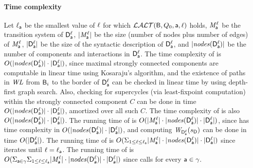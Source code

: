 \paragraph{Time complexity} 
Let 
$\ell_{\mathsf{a}}$ be the smallest value of $\ell$ for which  $\mathcal{LALT}(\mathsf{B}, Q_0, \mathsf{a}, \ell)$ holds, 
$\mathit{M}_{\mathsf{a}}^{\ell}$ be the transition system of $\mathsf{D}_{\mathsf{a}}^{\ell}$, 
$|\mathit{M}_{\mathsf{a}}^{\ell}|$ be the size (number of nodes plus number of edges) of $\mathit{M}_{\mathsf{a}}^{\ell}$, 
$|\mathsf{D}_{\mathsf{a}}^{\ell}|$ be the size of the syntactic description of $\mathsf{D}_{\mathsf{a}}^{\ell}$, and 
$|\mathit{nodes}(\mathsf{D}_{\mathsf{a}}^{\ell})|$ be the number of components and interactions in $\mathsf{D}_{\mathsf{a}}^{\ell}$.
%
The time complexity of  is $O(|\mathit{nodes}(\mathsf{D}_{\mathsf{a}}^{\ell})| \cdot |\mathsf{D}_{\mathsf{a}}^{\ell}|)$, since maximal strongly connected components
are computable in linear time using Kosaraju's algorithm, and the existence of paths in $\mathit{WL}$ from $\mathsf{B}_i$ to the border of $\mathsf{D}_{\mathsf{a}}^{\ell}$ can be checked in linear time by 
using depth-first graph search. Also, checking for supercycles (via least-fixpoint computation) within the strongly connected component $C$ can be done in time 
$O(|\mathit{nodes}(\mathsf{D}_{\mathsf{a}}^{\ell})| \cdot |\mathsf{D}_{\mathsf{a}}^{\ell}|)$, amortized over all such $C$.
%
The time complexity of  is also $O(|\mathit{nodes}(\mathsf{D}_{\mathsf{a}}^{\ell})| \cdot |\mathsf{D}_{\mathsf{a}}^{\ell}|)$.
%
The running time of  is $O(|\mathit{M}_{\mathsf{a}}^{\ell}| \cdot |\mathit{nodes}(\mathsf{D}_{\mathsf{a}}^{\ell})| \cdot |\mathsf{D}_{\mathsf{a}}^{\ell}|)$,
since \cLFP{$\dsks{\act}{\l}, \sD$} has time complexity in $O(|\mathit{nodes}(\mathsf{D}_{\mathsf{a}}^{\ell})| \cdot |\mathsf{D}_{\mathsf{a}}^{\ell}|)$, and computing 
$\mathit{W}_{\mathsf{D}_{\mathsf{a}}^{\ell}}({s_\mathsf{D}})$ can be done in time $O(|\mathsf{D}_{\mathsf{a}}^{\ell}|)$.
%
The running time of  is $O(\Sigma_{1 \le \ell \le \ell_{\mathsf{a}}} |\mathit{M}_{\mathsf{a}}^{\ell}| \cdot |\mathit{nodes}(\mathsf{D}_{\mathsf{a}}^{\ell})| \cdot |\mathsf{D}_{\mathsf{a}}^{\ell}|)$
since  iterates  until $\ell = \ell_{\mathsf{a}}$.
%
The running  time of  is
$O(\Sigma_{\mathsf{a} \in \gamma}  \Sigma_{1 \le \ell \le \ell_{\mathsf{a}}} |\mathit{M}_{\mathsf{a}}^{\ell}| \cdot |\mathit{nodes}(\mathsf{D}_{\mathsf{a}}^{\ell})| \cdot |\mathsf{D}_{\mathsf{a}}^{\ell}|)$
since  calls  for every $\mathsf{a} \in \gamma$.







